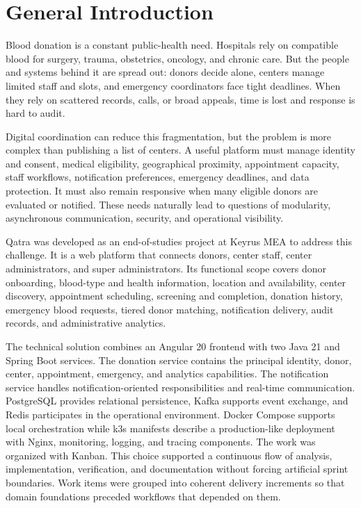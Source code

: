 \chapter*{General Introduction}

Blood donation is a constant public-health need. Hospitals rely on compatible blood for surgery, trauma, obstetrics, oncology, and chronic care.
But the people and systems behind it are spread out: donors decide alone, centers manage limited staff and slots, and emergency coordinators face tight deadlines.
When they rely on scattered records, calls, or broad appeals, time is lost and response is hard to audit.

Digital coordination can reduce this fragmentation, but the problem is more complex than publishing a list of centers. A useful platform must manage identity and consent, medical eligibility, geographical proximity, appointment capacity, staff workflows, notification preferences, emergency deadlines, and data protection. It must also remain responsive when many eligible donors are evaluated or notified. These needs naturally lead to questions of modularity, asynchronous communication, security, and operational visibility.

Qatra was developed as an end-of-studies project at Keyrus MEA to address this challenge. It is a web platform that connects donors, center staff, center administrators, and super administrators. Its functional scope covers donor onboarding, blood-type and health information, location and availability, center discovery, appointment scheduling, screening and completion, donation history, emergency blood requests, tiered donor matching, notification delivery, audit records, and administrative analytics.

The technical solution combines an Angular 20 frontend with two Java 21 and Spring Boot services. The donation service contains the principal identity, donor, center, appointment, emergency, and analytics capabilities. The notification service handles notification-oriented responsibilities and real-time communication. PostgreSQL provides relational persistence, Kafka supports event exchange, and Redis participates in the operational environment. Docker Compose supports local orchestration while k3s manifests describe a production-like deployment with Nginx, monitoring, logging, and tracing components.
\newpage
The work was organized with Kanban. This choice supported a continuous flow of analysis, implementation, verification, and documentation without forcing artificial sprint boundaries. Work items were grouped into coherent delivery increments so that domain foundations preceded workflows that depended on them.

